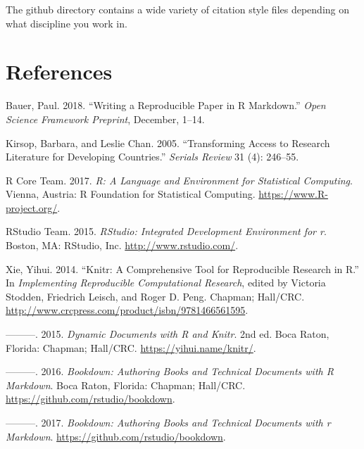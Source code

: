 \documentclass[
  letterpaper,
  DIV=11,
  numbers=noendperiod]{scrartcl}
\newlength{\cslhangindent}
\newlength{\cslentryspacingunit} %
\newenvironment{CSLReferences}[2] %
 {%
  \setlength{\parindent}{0pt}
  \ifodd #1
  \let\oldpar\par
  \def\par{\hangindent=\cslhangindent\oldpar}
  \fi
  \setlength{\parskip}{#2\cslentryspacingunit}
 }%
 {}
\begin{document}
The github directory contains a wide variety of citation style files
depending on what discipline you work in.

\newpage

\hypertarget{references}{%
\section*{References}\label{references}}

\hypertarget{refs}{}
\begin{CSLReferences}{1}{0}
\leavevmode{}%
Bauer, Paul. 2018. {``Writing a Reproducible Paper in {R} Markdown.''}
\emph{Open Science Framework Preprint}, December, 1--14.

\leavevmode{}%
Kirsop, Barbara, and Leslie Chan. 2005. {``Transforming Access to
Research Literature for Developing Countries.''} \emph{Serials Review}
31 (4): 246--55.

\leavevmode{}%
R Core Team. 2017. \emph{R: A Language and Environment for Statistical
Computing}. Vienna, Austria: R Foundation for Statistical Computing.
\url{https://www.R-project.org/}.

\leavevmode{}%
RStudio Team. 2015. \emph{RStudio: Integrated Development Environment
for r}. Boston, MA: RStudio, Inc. \url{http://www.rstudio.com/}.

\leavevmode{}%
Xie, Yihui. 2014. {``Knitr: A Comprehensive Tool for Reproducible
Research in {R}.''} In \emph{Implementing Reproducible Computational
Research}, edited by Victoria Stodden, Friedrich Leisch, and Roger D.
Peng. Chapman; Hall/CRC.
\url{http://www.crcpress.com/product/isbn/9781466561595}.

\leavevmode{}%
---------. 2015. \emph{Dynamic Documents with {R} and Knitr}. 2nd ed.
Boca Raton, Florida: Chapman; Hall/CRC. \url{https://yihui.name/knitr/}.

\leavevmode{}%
---------. 2016. \emph{Bookdown: Authoring Books and Technical Documents
with {R} Markdown}. Boca Raton, Florida: Chapman; Hall/CRC.
\url{https://github.com/rstudio/bookdown}.

\leavevmode{}%
---------. 2017. \emph{Bookdown: Authoring Books and Technical Documents
with r Markdown}. \url{https://github.com/rstudio/bookdown}.


\end{CSLReferences}
\end{document}
